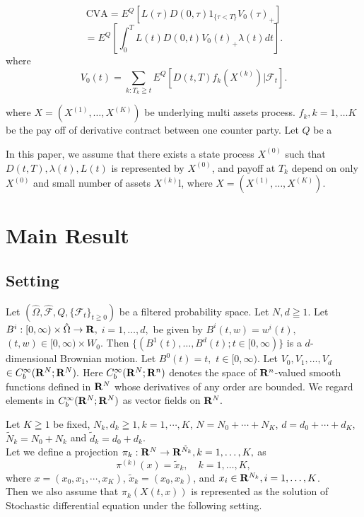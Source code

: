 \documentclass[12pt]{article}
\begin{document}
$$\text{CVA}= E^Q[L(\tau)D(0,\tau)1_{\{\tau <T\}}V_0(\tau)_{+}]$$ $$=E^{Q}[\int_0^T L(t)D(0,t) V_0(t)_{+} \lambda(t) dt ]  .$$
where $$V_0(t) = \sum_{k:T_k\geqq t} E^{Q}[D(t,T) f_k(X^{(k)}) |\mathcal{F}_t].$$
 

 where $X=(X^{(1)}, \ldots, X^{(K)})$ be underlying multi assets process. $f_k, k=1,\ldots K$ be the pay off of derivative contract between one counter party. Let $Q$ be a 

 In this paper, we assume that there exists a state process $X^{(0)}$ such that $D(t,T), \lambda(t),
L(t)$ is represented by $X^{(0)}$, and payoff at $T_k$ depend on only $X^{(0)}$ and small number of 
assets $X^{(k)}$l, where $X=(X^{(1)}, \ldots, X^{(K)})$.



\section{Main Result}
\subsection{Setting}
Let $(\hat{\Omega}, \hat{\mathcal{F}}, Q, \{\mathcal{F}_t\}_{t\geqq 0})$ be a filtered probability space.
Let $N, d \geqq 1.$
Let $B^i:[0,\infty )\times \hat{\Omega} \to {\bf R},$ $i=1,\ldots ,d,$ be given 
by
$B^i(t,w) =w^i(t),$ $(t,w)\in [0,\infty )\times W_0.$
Then $ \{ (B^1(t), \ldots ,B^d(t) ; t \in [0,\infty ) \}$ 
is a $d$-dimensional Brownian motion.
Let $B^0(t) = t,$ $t \in [0,\infty ).$
Let $V_0,V_1,\ldots ,V_d$ 
$ \in C^{\infty}_b({\bf R}^N;{\bf R}^N).$
Here $C^{\infty}_b({\bf R}^N;{\bf R}^n)$ denotes 
the space of ${\bf R}^n$-valued smooth functions defined 
in ${\bf R}^N$ whose derivatives of any order are bounded.
We regard elements in $C^{\infty}_b({\bf R}^N;{\bf R}^N)$ 
as vector fields on ${\bf R}^N.$

Let $K \geqq 1$ be fixed, ${N}_k, d_k \geqq 1, k=1, \cdots, K$, 
$N= N_0+ \cdots + N_K$, $d=d_0+\cdots +d_K$, 
$ \tilde{N}_k=N_0+N_k$ and $\tilde{d}_k=d_0+d_k$.\\
Let we define a projection $\pi_k: {\bf R}^N \to {\bf R}^{\tilde{N}_k}, k=1,\ldots,K,$ as 
$$ \pi^{(k)}(x)= \tilde{x}_k, \quad k=1,\ldots,K,$$
where $x=(x_0,x_1, \cdots, x_K)$, $\tilde{x}_k=(x_0,x_k)$, and $x_i \in {\bf R}^{N_k}, i=1,\ldots,K$.\\
Then we also assume that $\pi_k(X(t,x))$  is represented as the solution of Stochastic differential equation
under the following setting.
\end{document}
